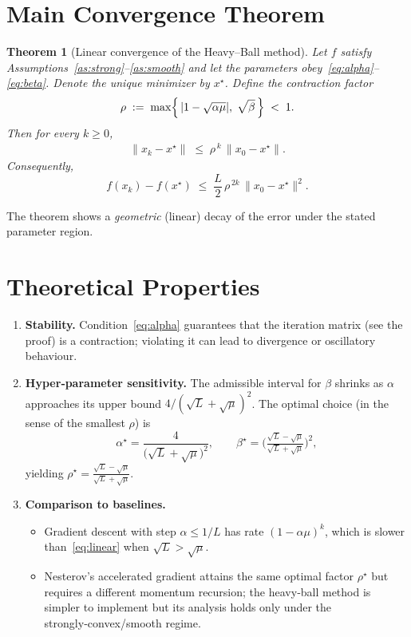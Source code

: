 \documentclass[12pt]{article}
\newtheorem{theorem}{Theorem}
\begin{document}
\section*{Main Convergence Theorem}
\begin{theorem}[Linear convergence of the Heavy–Ball method]\label{thm:linear}
Let $f$ satisfy Assumptions~\ref{as:strong}--\ref{as:smooth} and let the
parameters obey~\eqref{eq:alpha}--\eqref{eq:beta}.  
Denote the unique minimizer by $x^{\star}$.  
Define the contraction factor
\[
\rho\;:=\;\max\Bigl\{\,|1-\sqrt{\alpha\mu}|,\;\sqrt{\beta}\,\Bigr\}\;<\;1 .
\]
Then for every $k\ge 0$,
\begin{align}
\|x_{k}-x^{\star}\|\;\le\;\rho^{\,k}\,\|x_{0}-x^{\star}\| . \label{eq:linear}
\end{align}
Consequently,
\[
f(x_{k})-f(x^{\star})\;\le\;\frac{L}{2}\,\rho^{\,2k}\,\|x_{0}-x^{\star}\|^{2}.
\]
\end{theorem}
The theorem shows a \emph{geometric} (linear) decay of the error under the stated parameter region.

\section*{Theoretical Properties}
\begin{enumerate}[label={\arabic*.}]
\item \textbf{Stability.} Condition~\eqref{eq:alpha} guarantees that the
iteration matrix (see the proof) is a contraction; violating it can lead
to divergence or oscillatory behaviour.
\item \textbf{Hyper‑parameter sensitivity.} The admissible interval for
$\beta$ shrinks as $\alpha$ approaches its upper bound
$4/(\sqrt{L}+\sqrt{\mu})^{2}$.  The optimal choice (in the sense of the
smallest $\rho$) is
\[
\alpha^{\star}=\frac{4}{\bigl(\sqrt{L}+\sqrt{\mu}\bigr)^{2}},\qquad
\beta^{\star}=\bigl(\tfrac{\sqrt{L}-\sqrt{\mu}}{\sqrt{L}+\sqrt{\mu}}\bigr)^{2},
\]
yielding $\rho^{\star}= \frac{\sqrt{L}-\sqrt{\mu}}{\sqrt{L}+\sqrt{\mu}}$.
\item \textbf{Comparison to baselines.}
\begin{itemize}
\item Gradient descent with step $\alpha\le 1/L$ has rate
$(1-\alpha\mu)^{k}$, which is slower than~\eqref{eq:linear} when
$\sqrt{L}\!>\!\sqrt{\mu}$.
\item Nesterov’s accelerated gradient attains the same optimal factor
$\rho^{\star}$ but requires a different momentum recursion; the heavy‑ball
method is simpler to implement but its analysis holds only under the
strongly‑convex/smooth regime.
\end{itemize}
\end{enumerate}
\end{document}

